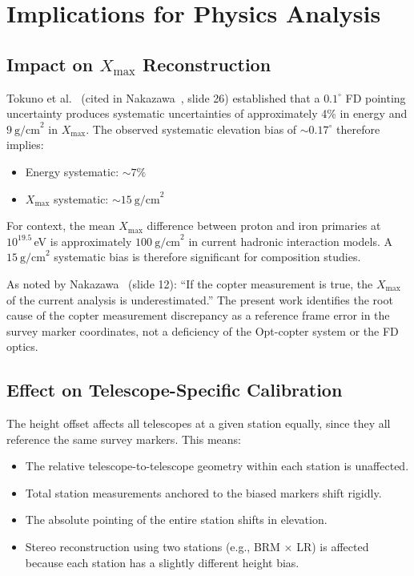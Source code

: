 \documentclass[11pt,letterpaper]{article}
\newcommand{\degree}{^\circ}
\newcommand{\Xmax}{X_{\text{max}}}
\begin{document}
\section{Implications for Physics Analysis}

\subsection{Impact on $\Xmax$ Reconstruction}

Tokuno et al.~\cite{tokuno} (cited in Nakazawa~\cite{nakazawa2020}, slide 26) established that a $0.1\degree$ FD pointing uncertainty produces systematic uncertainties of approximately 4\% in energy and $9~\text{g/cm}^2$ in $\Xmax$. The observed systematic elevation bias of $\sim\!0.17\degree$ therefore implies:

\begin{itemize}[nosep]
\item Energy systematic: $\sim\!7\%$
\item $\Xmax$ systematic: $\sim\!15~\text{g/cm}^2$
\end{itemize}

\noindent For context, the mean $\Xmax$ difference between proton and iron primaries at $10^{19.5}$\,eV is approximately $100~\text{g/cm}^2$ in current hadronic interaction models. A $15~\text{g/cm}^2$ systematic bias is therefore significant for composition studies.

As noted by Nakazawa~\cite{nakazawa2020} (slide 12): ``If the copter measurement is true, the $\Xmax$ of the current analysis is underestimated.'' The present work identifies the root cause of the copter measurement discrepancy as a reference frame error in the survey marker coordinates, not a deficiency of the Opt-copter system or the FD optics.

\subsection{Effect on Telescope-Specific Calibration}

The height offset affects all telescopes at a given station equally, since they all reference the same survey markers. This means:

\begin{itemize}[nosep]
\item The relative telescope-to-telescope geometry within each station is unaffected.
\item Total station measurements anchored to the biased markers shift rigidly.
\item The absolute pointing of the entire station shifts in elevation.
\item Stereo reconstruction using two stations (e.g., BRM $\times$ LR) is affected because each station has a slightly different height bias.
\end{itemize}
\end{document}
